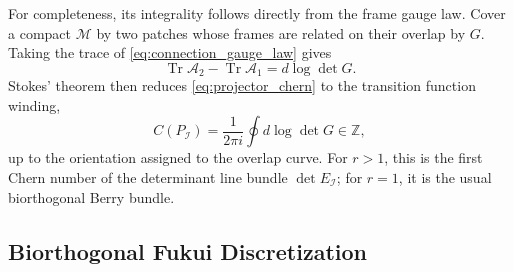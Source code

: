 \documentclass[11pt]{article}
\numberwithin{equation}{section}
\begin{document}
For completeness, its integrality follows directly from the frame gauge
law. Cover a compact $\mathcal M$ by two patches whose frames are related
on their overlap by $G$. Taking the trace of
\eqref{eq:connection_gauge_law} gives
\begin{equation}
  \operatorname{Tr}\mathcal A_2-
  \operatorname{Tr}\mathcal A_1=d\log\det G .
\end{equation}
Stokes' theorem then reduces \eqref{eq:projector_chern} to the transition
function winding,
\begin{equation}
  C(P_{\mathcal I})=
  \frac{1}{2\pi i}\oint d\log\det G\in\mathbb Z,
  \label{eq:chern_integrality}
\end{equation}
up to the orientation assigned to the overlap curve. For $r>1$, this is
the first Chern number of the determinant line bundle
$\det E_{\mathcal I}$; for $r=1$, it is the usual biorthogonal Berry
bundle.

\subsection{Biorthogonal Fukui Discretization}
\end{document}
